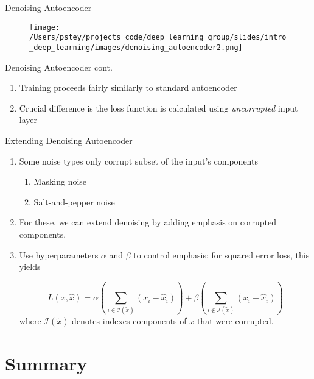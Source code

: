 \documentclass[pdf]{beamer}
\begin{document}
						
			
			\begin{frame}{Denoising Autoencoder}
			\begin{figure}
				\texttt{[image: /Users/pstey/projects\_code/deep\_learning\_group/slides/intro\_deep\_learning/images/denoising\_autoencoder2.png]}
			\end{figure}	
			\end{frame}
	

			\begin{frame}{Denoising Autoencoder cont.}
			\begin{enumerate}
				\item Training proceeds fairly similarly to standard autoencoder 
				\item Crucial difference is the loss function is calculated using \textit{uncorrupted} input layer 
			\end{enumerate}
			\end{frame}
			

		\begin{frame} {Extending Denoising Autoencoder}
		\begin{enumerate}
			\item Some noise types only corrupt subset of the input's components 
			\begin{enumerate}[1]
				\item Masking noise
				\item Salt-and-pepper noise
			\end{enumerate}
			\item For these, we can extend denoising by adding emphasis on corrupted components.
			\item Use hyperparameters $\alpha$ and $\beta$ to control emphasis; for squared error loss, this yields
		
			$$ L(x, \hat{x}) = \alpha \left( \sum_{i \in \mathcal{I}(\tilde{x})} \left(x_i - \hat{x}_i \right) \right)   + \beta \left( \sum_{i \notin \mathcal{I}(\tilde{x})} \left(x_i - \hat{x}_i \right) \right)$$
			where $ \mathcal{I}(\tilde{x}) $ denotes indexes components of $x$ that were corrupted.
		\end{enumerate}
		\end{frame}




\section{Summary}
\end{document}
